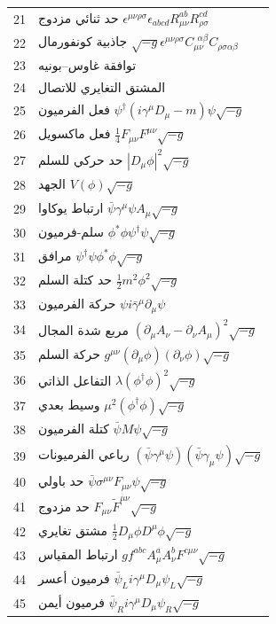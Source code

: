 \documentclass[11pt,a4paper]{article}
\begin{document}
\begin{longtable}{r l}
		21 & حد ثنائي مزدوج \(\epsilon^{\mu\nu\rho\sigma}\epsilon_{abcd}R_{\mu\nu}^{ab}R_{\rho\sigma}^{cd}\) \\
		22 & جاذبية كونفورمال \(\sqrt{-g}\epsilon^{\mu\nu\rho\sigma}C_{\mu\nu}^{\ \ \alpha\beta}C_{\rho\sigma\alpha\beta}\) \\
		23 & توافقة غاوس–بونيه \\
		24 & المشتق التغايري للاتصال \\
		25 & فعل الفرميون \(\psi^\dagger(i\gamma^\mu D_\mu - m)\psi\sqrt{-g}\) \\
		26 & فعل ماكسويل \(\frac{1}{4}F_{\mu\nu}F^{\mu\nu}\sqrt{-g}\) \\
		27 & حد حركي للسلم \(|D_\mu\phi|^2\sqrt{-g}\) \\
		28 & الجهد \(V(\phi)\sqrt{-g}\) \\
		29 & ارتباط يوكاوا \(\bar{\psi}\gamma^\mu\psi A_\mu\sqrt{-g}\) \\
		30 & سلم-فرميون \(\phi^*\phi\psi^\dagger\psi\sqrt{-g}\) \\
		31 & مرافق \(\psi^\dagger\psi\phi^*\phi\sqrt{-g}\) \\
		32 & حد كتلة السلم \(\frac{1}{2}m^2\phi^2\sqrt{-g}\) \\
		33 & حركة الفرميون \(\psi i\bar{\gamma}^\mu\partial_\mu\psi\) \\
		34 & مربع شدة المجال \((\partial_\mu A_\nu - \partial_\nu A_\mu)^2\sqrt{-g}\) \\
		35 & حركة السلم \(g^{\mu\nu}(\partial_\mu\phi)(\partial_\nu\phi)\sqrt{-g}\) \\
		36 & التفاعل الذاتي \(\lambda(\phi^\dagger\phi)^2\sqrt{-g}\) \\
		37 & وسيط بعدي \(\mu^2(\phi^\dagger\phi)\sqrt{-g}\) \\
		38 & كتلة الفرميون \(\bar{\psi}M\psi\sqrt{-g}\) \\
		39 & رباعي الفرميونات \((\bar{\psi}\gamma^\mu\psi)(\bar{\psi}\gamma_\mu\psi)\sqrt{-g}\) \\
		40 & حد باولي \(\bar{\psi}\sigma^{\mu\nu}F_{\mu\nu}\psi\sqrt{-g}\) \\
		41 & حد مزدوج \(F_{\mu\nu}\tilde{F}^{\mu\nu}\sqrt{-g}\) \\
		42 & مشتق تغايري \(\frac{1}{2}D_\mu\phi D^\mu\phi\sqrt{-g}\) \\
		43 & ارتباط المقياس \(g f^{abc}A^a_\mu A^b_\nu F^{c\mu\nu}\sqrt{-g}\) \\
		44 & فرميون أعسر \(\bar{\psi}_L i\gamma^\mu D_\mu\psi_L\sqrt{-g}\) \\
		45 & فرميون أيمن \(\bar{\psi}_R i\gamma^\mu D_\mu\psi_R\sqrt{-g}\) \\

\end{longtable}
\end{document}
